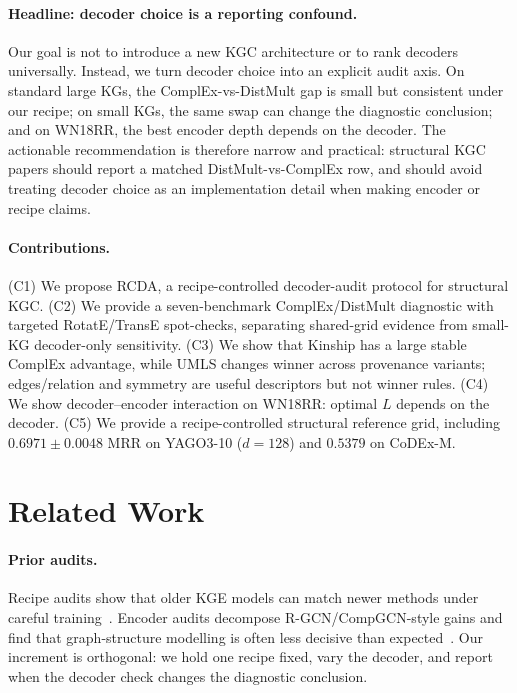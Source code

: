 \documentclass[runningheads]{llncs}
\newcommand{\ours}{\textsc{RCDA}\xspace}
\begin{document}
\paragraph{Headline: decoder choice is a reporting confound.}
Our goal is not to introduce a new KGC architecture or to rank decoders universally. Instead, we turn decoder choice into an explicit audit axis. On standard large KGs, the ComplEx-vs-DistMult gap is small but consistent under our recipe; on small KGs, the same swap can change the diagnostic conclusion; and on WN18RR, the best encoder depth depends on the decoder. The actionable recommendation is therefore narrow and practical: structural KGC papers should report a matched DistMult-vs-ComplEx row, and should avoid treating decoder choice as an implementation detail when making encoder or recipe claims.

\paragraph{Contributions.}
(C1) We propose \ours, a recipe-controlled decoder-audit protocol for structural KGC. (C2) We provide a seven-benchmark ComplEx/DistMult diagnostic with targeted RotatE/TransE spot-checks, separating shared-grid evidence from small-KG decoder-only sensitivity. (C3) We show that Kinship has a large stable ComplEx advantage, while UMLS changes winner across provenance variants; edges/relation and symmetry are useful descriptors but not winner rules. (C4) We show decoder--encoder interaction on WN18RR: optimal $L$ depends on the decoder. (C5) We provide a recipe-controlled structural reference grid, including $0.6971 \pm 0.0048$ MRR on YAGO3-10 ($d{=}128$) and $0.5379$ on CoDEx-M.

\section{Related Work}
\label{sec:related}

\paragraph{Prior audits.}
Recipe audits show that older KGE models can match newer methods under careful training~\cite{ruffinelli2020olderboys,ali2021hparam,akrami2020realistic,sun2020reevaluation}. Encoder audits decompose R-GCN/CompGCN-style gains and find that graph-structure modelling is often less decisive than expected~\cite{zhang2022rethinking}. Our increment is orthogonal: we hold one recipe fixed, vary the decoder, and report when the decoder check changes the diagnostic conclusion.
\end{document}
